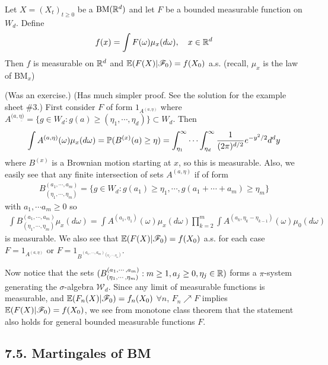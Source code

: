 \documentclass[12pt,a4paper]{report}
\newenvironment{proof}
{\begin{changemargin}{1cm}{0.5cm} 
	}%
	{\end{changemargin}
}
\begin{document}
 Let $X = (X_t)_{t\geq 0}$ be a $\text{BM}(\mathbb{R}^d)$ and let $F$ be a bounded measurable function on $W_d$. Define
\begin{align*}
f(x) = \int F(\omega) \mu_x (d\omega), \quad x\in \mathbb{R}^d
\end{align*}
Then $f$ is measurable on $\mathbb{R}^d$ and $\mathbb{E}(F(X) |\mathscr{F}_0)  = f(X_0)$ a.s. (recall, $\mu_x$ is the law of $\text{BM}_x$)
\begin{proof}
\pf (Was an exercise.) (Has much simpler proof. See the solution for the example sheet {\#}3.) First consider $F$ of form $1_{A^{(a,\eta)}}$ where $A^{(a,\underline{\eta)} } = \{ g \in W_d : g(a) \geq (\eta_1, \cdots, \eta_d ) \} \subset W_d$. Then
\begin{align*}
\int A^{(a,\eta)}(\omega) \mu_x( d\omega) = \mathbb{P} ( B^{(x)} (a) \geq \eta) = \int_{\eta_1}^{\infty} \cdots \int_{\eta_d}^{\infty} \frac{1}{(2\pi)^{d/2}}e^{-y^2 /2} d^d y
\end{align*}
where $B^{(x)}$ is a Brownian motion starting at $x$, so this is measurable. Also, we easily see that any finite intersection of sets $A^{(a,\eta)}$ if of form
\begin{align*}
B^{(a_1, \cdots, a_m)}_{(\eta_1, \cdots, \eta_m)} = \{ g \in W_d : g(a_1) \geq \eta_1, \cdots, g(a_1 + \cdots + a_m) \geq \eta_m \}
\end{align*}
with $a_1, \cdots a_m \geq 0$ so
\begin{align*}
\int B^{(a_1, \cdots, a_m)}_{(\eta_1, \cdots, \eta_m)} \mu_x( d\omega) =  \int A^{(a_1,\eta_1)}(\omega) \mu_x( d\omega) \prod_{k=2}^m \int A^{(a_k,\eta_{k} - \eta_{k-1})}(\omega) \mu_0( d\omega)
\end{align*}
is measurable. We also see that $\mathbb{E}(F(X) | \mathscr{F}_0 ) = f(X_0)$ a.s. for each case $F = 1_{A^{(a,\eta)}}$ or $F = 1_{B^{(a_1, \cdots, a_m)_{(\eta_1, \cdots, \eta_m)}}}$.

\quad Now notice that the sets $(B^{(a_1, \cdots, a_m)}_{(\eta_1, \cdots, \eta_m)} : m\geq 1, a_j \geq 0, \eta_j \in \mathbb{R})$ forms a $\pi$-system generating the $\sigma$-algebra $\mathscr{W}_d$. Since any limit of measurable functions is measurable, and $\mathbb{E}(F_n(X) | \mathscr{F}_0 ) = f_n(X_0)$ $\forall n$, $F_n \nearrow F$ implies $\mathbb{E}(F(X) | \mathscr{F}_0 ) = f(X_0)$, we see from monotone class theorem that the statement also holds for general bounded measurable functions $F$.

\eop
\end{proof}
\s

\subsection*{7.5. Martingales of BM}
\end{document}
